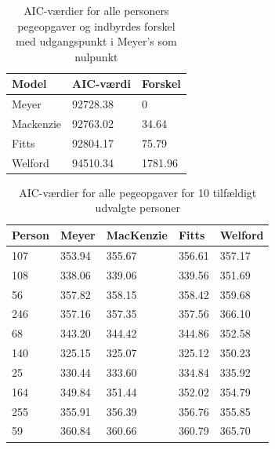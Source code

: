 \begin{table}[h]
\centering
\begin{tabular}{lll}
Model 	  & AIC-værdi & Forskel\\\hline
Meyer 	  & 92728.38 & 0 \\
Mackenzie & 92763.02 & 34.64 \\
Fitts 	  & 92804.17 & 75.79 \\
Welford   & 94510.34 & 1781.96
\end{tabular}
\caption{AIC-værdier for alle personers pegeopgaver og indbyrdes forskel med udgangspunkt i Meyer's som nulpunkt}
\label{tab:table_analysis_aic1}
\end{table}

\begin{table}[h]
\centering
\begin{tabular}{lllll}
Person & Meyer  & MacKenzie & Fitts  & Welford \\\hline
107    & 353.94 & 355.67    & 356.61 & 357.17  \\
108    & 338.06 & 339.06    & 339.56 & 351.69  \\
56     & 357.82 & 358.15    & 358.42 & 359.68  \\
246    & 357.16 & 357.35    & 357.56 & 366.10  \\
68     & 343.20 & 344.42    & 344.86 & 352.58  \\
140    & 325.15 & 325.07    & 325.12 & 350.23  \\
25     & 330.44 & 333.60    & 334.84 & 335.92  \\
164    & 349.84 & 351.44    & 352.02 & 354.79  \\
255    & 355.91 & 356.39    & 356.76 & 355.85  \\
59     & 360.84 & 360.66    & 360.79 & 365.70
\end{tabular}
\caption{AIC-værdier for alle pegeopgaver for 10 tilfældigt udvalgte personer}
\label{tab:table_analysis_aic2}
\end{table}

